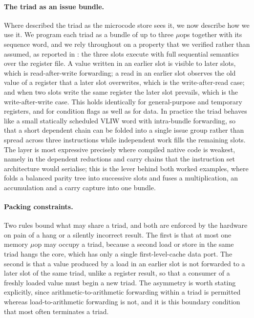 \paragraph{The triad as an issue bundle.}
Where  described the triad as the microcode store sees
it, we now describe how we use it. We program each triad as a bundle of up to
three $\mu$ops together with its sequence word, and we rely throughout on a
property that we verified rather than assumed, as reported in
: the three slots execute with full sequential semantics
over the register file. A value written in an earlier slot is visible to later
slots, which is read-after-write forwarding; a read in an earlier slot observes
the old value of a register that a later slot overwrites, which is the
write-after-read case; and when two slots write the same register the later
slot prevails, which is the write-after-write case. This holds identically for
general-purpose and temporary registers, and for condition flags as well as for
data. In practice the triad behaves like a small statically scheduled VLIW word
with intra-bundle forwarding, so that a short dependent chain can be folded into
a single issue group rather than spread across three instructions while
independent work fills the remaining slots. The layer is most expressive
precisely where compiled native code is weakest, namely in the dependent
reductions and carry chains that the instruction set architecture would
serialise; this is the lever behind both worked examples, where
 folds a balanced parity tree into successive slots and
 fuses a multiplication, an accumulation and a carry
capture into one bundle.

\paragraph{Packing constraints.}
Two rules bound what may share a triad, and both are enforced by the hardware on
pain of a hang or a silently incorrect result. The first is that at most one
memory $\mu$op may occupy a triad, because a second load or store in the same
triad hangs the core, which has only a single first-level-cache data port. The
second is that a value produced by a load in an earlier slot is not forwarded to
a later slot of the same triad, unlike a register result, so that a consumer of
a freshly loaded value must begin a new triad. The asymmetry is worth stating
explicitly, since arithmetic-to-arithmetic forwarding within a triad is
permitted whereas load-to-arithmetic forwarding is not, and it is this boundary
condition that most often terminates a triad.

